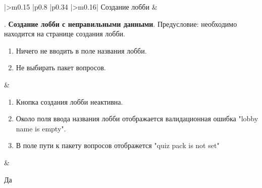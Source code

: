 \begin{landscape}
\begin{longtable}[l]{|>{\centering}m{0.15\textwidth}
					  |p{0.8\textwidth}
					  |p{0.34\textwidth}
					  |>{\centering\arraybackslash}m{0.16\textwidth}|}
	Создание лобби &
	\begin{minipage}[t]{1\linewidth}
		\vspace{-1\baselineskip}
		\testnumber. \textbf{Создание лобби с неправильными данными}.\newline
 		Предусловие: необходимо находится на странице создания лобби.
 		\begin{enumerate}
			\item Ничего не вводить в поле названия лобби.
   			\item Не выбирать пакет вопросов.
 		\end{enumerate}
 	\end{minipage} &
	\begin{minipage}[t]{1\linewidth}
		\vspace{-1\baselineskip}
		\begin{enumerate}
			\item Кнопка создания лобби неактивна.
   			\item Около поля ввода названия лобби отображается валидационная ошибка "lobby name is empty".
   			\item В поле пути к пакету вопросов отображется "quiz pack is not set"
		\end{enumerate}
	\end{minipage} &
	\begin{minipage}[t]{1\linewidth}
		\vspace{-1\baselineskip}
		\centering Да
	\end{minipage} \\



\end{longtable}
\end{landscape}
